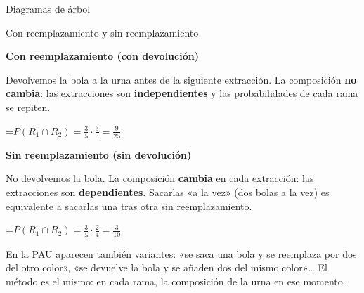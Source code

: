 \documentclass[11pt,a4paper]{article}
\newcommand{\fmm}[1]{\setbox0=\hbox{$#1$}\ifdim\wd0>\linewidth\fmdisp{#1}\else\mbox{\box0}\fi}
\newcommand{\fmdisp}[1]{\[\setbox2=\hbox{$\displaystyle #1$}\ifdim\wd2>\linewidth\resizebox{\linewidth}{!}{\box2}\else\box2\fi\]}
\begin{document}
\begin{fmdef}{Diagramas de árbol}
\end{fmdef}

\begin{fmdef}{Con reemplazamiento y sin reemplazamiento}
\par\noindent \begin{minipage}[t]{0.488\linewidth}\vspace{0pt}\begin{tcolorbox}[enhanced,colback=fmsurface,colframe=fmmuted!35,arc=2.5mm,boxrule=0.6pt,left=2.5mm,right=2.5mm,top=1.5mm,bottom=1.5mm,before upper=\raggedright,equal height group=cmp2]{\color{fmnavy}\bfseries Con reemplazamiento (con devolución)}\par

Devolvemos la bola a la urna antes de la siguiente extracción. La composición \textbf{no cambia}: las extracciones son \textbf{independientes} y las probabilidades de cada rama se repiten.

\fmm{P(R_1\cap R_2)=\frac35\cdot\frac35=\frac{9}{25}}\end{tcolorbox}\end{minipage}\hfill\begin{minipage}[t]{0.488\linewidth}\vspace{0pt}\begin{tcolorbox}[enhanced,colback=fmsurface,colframe=fmmuted!35,arc=2.5mm,boxrule=0.6pt,left=2.5mm,right=2.5mm,top=1.5mm,bottom=1.5mm,before upper=\raggedright,equal height group=cmp2]{\color{fmnavy}\bfseries Sin reemplazamiento (sin devolución)}\par

No devolvemos la bola. La composición \textbf{cambia} en cada extracción: las extracciones son \textbf{dependientes}. Sacarlas «a la vez» (dos bolas a la vez) es equivalente a sacarlas una tras otra sin reemplazamiento.

\fmm{P(R_1\cap R_2)=\frac35\cdot\frac24=\frac{3}{10}}\end{tcolorbox}\end{minipage}\par\medskip

\begin{fmnote}En la PAU aparecen también variantes: «se saca una bola y se reemplaza por dos del otro color», «se devuelve la bola y se añaden dos del mismo color»\dots{} El método es el mismo: en cada rama, la composición de la urna en ese momento.\end{fmnote}
\end{fmdef}
\end{document}
